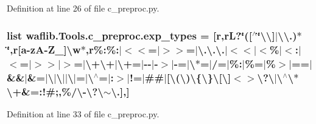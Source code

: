 Definition at line 26 of file c\+\_\+preproc.\+py.

\subsubsection[{\texorpdfstring{exp\+\_\+types}{exp_types}}]{\setlength{\rightskip}{0pt plus 5cm}list waflib.\+Tools.\+c\+\_\+preproc.\+exp\+\_\+types = \mbox{[}r,r\textquotesingle{}L?\char`\"{}(\mbox{[}$^\wedge$\char`\"{}\textbackslash{}\textbackslash{}\mbox{]}$\vert$\textbackslash{}\textbackslash{}.)$\ast$\char`\"{}\textquotesingle{},r\textquotesingle{}\mbox{[}{\bf a}-\/zA-\/Z\+\_\+\mbox{]}\textbackslash{}w$\ast$\textquotesingle{},r\textquotesingle{}\%\+:\%\+:$\vert$$<$$<$=$\vert$$>$$>$=$\vert$\textbackslash{}.\textbackslash{}.\textbackslash{}.$\vert$$<$$<$$\vert$$<$\%$\vert$$<$\+:$\vert$$<$=$\vert$$>$$>$$\vert$$>$=$\vert$\textbackslash{}+\textbackslash{}+$\vert$\textbackslash{}+=$\vert$-\/-\/$\vert$-\/$>$$\vert$-\/=$\vert$\textbackslash{}$\ast$=$\vert$/=$\vert$\%\+:$\vert$\%=$\vert$\%$>$$\vert$==$\vert$\&\&$\vert$\&=$\vert$\textbackslash{}$\vert$\textbackslash{}$\vert$$\vert$\textbackslash{}$\vert$=$\vert$\textbackslash{}$^\wedge$=$\vert$\+:$>$$\vert$!=$\vert$\#\#$\vert$\mbox{[}\textbackslash{}(\textbackslash{})\textbackslash{}\{\textbackslash{}\}\textbackslash{}\mbox{[}\textbackslash{}\mbox{]}$<$$>$\textbackslash{}?\textbackslash{}$\vert$\textbackslash{}$^\wedge$\textbackslash{}$\ast$\textbackslash{}+\&=\+:!\#;,\%/\textbackslash{}-\/\textbackslash{}?\textbackslash{}$\sim$\textbackslash{}.\mbox{]}\textquotesingle{},\mbox{]}}\hypertarget{namespacewaflib_1_1_tools_1_1c__preproc_a790fdf13e928febd4cd6be6f8d2b0efe}{}\label{namespacewaflib_1_1_tools_1_1c__preproc_a790fdf13e928febd4cd6be6f8d2b0efe}


Definition at line 33 of file c\+\_\+preproc.\+py.


